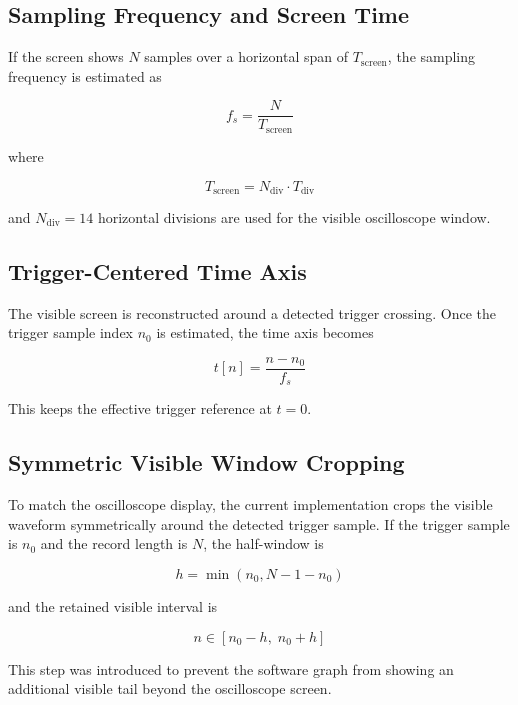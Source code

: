 \documentclass[conference]{IEEEtran}
\begin{document}
\subsection{Sampling Frequency and Screen Time}
If the screen shows $N$ samples over a horizontal span of $T_{\text{screen}}$, the sampling frequency is estimated as

\begin{equation}
f_s = \frac{N}{T_{\text{screen}}}
\end{equation}

where

\begin{equation}
T_{\text{screen}} = N_{\text{div}} \cdot T_{\text{div}}
\end{equation}

and $N_{\text{div}} = 14$ horizontal divisions are used for the visible oscilloscope window.

\subsection{Trigger-Centered Time Axis}
The visible screen is reconstructed around a detected trigger crossing. Once the trigger sample index $n_0$ is estimated, the time axis becomes

\begin{equation}
t[n] = \frac{n - n_0}{f_s}
\end{equation}

This keeps the effective trigger reference at $t = 0$.

\subsection{Symmetric Visible Window Cropping}
To match the oscilloscope display, the current implementation crops the visible waveform symmetrically around the detected trigger sample. If the trigger sample is $n_0$ and the record length is $N$, the half-window is

\begin{equation}
h = \min(n_0, N - 1 - n_0)
\end{equation}

and the retained visible interval is

\begin{equation}
n \in [n_0 - h,\; n_0 + h]
\end{equation}

This step was introduced to prevent the software graph from showing an additional visible tail beyond the oscilloscope screen.
\end{document}
